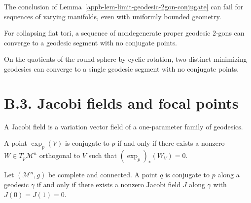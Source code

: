 \begin{remark}
\label{appb-rem-limit-failure-varying-manifolds}
The conclusion of Lemma~\ref{appb-lem-limit-geodesic-2gon-conjugate} can fail for sequences of varying manifolds, even with uniformly bounded geometry.
\end{remark}

\begin{example}
\label{appb-ex-collapsing-flat-tori}
For collapsing flat tori, a sequence of nondegenerate proper geodesic $2$-gons can converge to a geodesic segment with no conjugate points.
\end{example}

\begin{example}
\label{appb-ex-spherical-orbifold}
On the quotients of the round sphere by cyclic rotation, two distinct minimizing geodesics can converge to a single geodesic segment with no conjugate points.
\end{example}

\section*{B.3. Jacobi fields and focal points}

\begin{definition}
\label{appb-def-jacobi-field}
A Jacobi field is a variation vector field of a one-parameter family of geodesics.
\end{definition}

\begin{lemma}
\label{appb-lem-conjugate-differential-exp}
A point $\exp_p(V)$ is conjugate to $p$ if and only if there exists a nonzero $W\in T_p\mathcal M^n$ orthogonal to $V$ such that $(\exp_p)_*(W_V)=0$.
\end{lemma}

\begin{proposition}
\label{appb-prop-jacobi-characterizes-conjugacy}
Let $(\mathcal M^n,g)$ be complete and connected. A point $q$ is conjugate to $p$ along a geodesic $\gamma$ if and only if there exists a nonzero Jacobi field $J$ along $\gamma$ with $J(0)=J(1)=0$.
\end{proposition}

